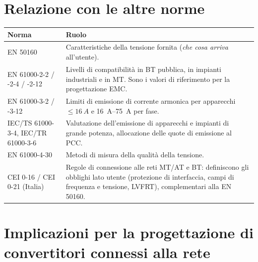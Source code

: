 \documentclass[11pt,a4paper]{article}
\begin{document}
\section{Relazione con le altre norme}

\begin{table}[h]
\centering
\small
\begin{tabular}{p{}p{}}
\toprule
\textbf{Norma} & \textbf{Ruolo} \\
\midrule
EN 50160 & Caratteristiche della tensione fornita (\emph{che cosa arriva} all'utente). \\
EN 61000-2-2 / -2-4 / -2-12 & Livelli di compatibilità in BT pubblica, in impianti
industriali e in MT. Sono i valori di riferimento per la progettazione EMC. \\
EN 61000-3-2 / -3-12 & Limiti di emissione di corrente armonica per apparecchi
$\le \SI{16}{A}$ e \SIrange{16}{75}{A} per fase. \\
IEC/TS 61000-3-4, IEC/TR 61000-3-6 & Valutazione dell'emissione di apparecchi e
impianti di grande potenza, allocazione delle quote di emissione al PCC. \\
EN 61000-4-30 & Metodi di misura della qualità della tensione. \\
CEI 0-16 / CEI 0-21 (Italia) & Regole di connessione alle reti MT/AT e BT: definiscono
gli obblighi lato utente (protezione di interfaccia, campi di frequenza e tensione,
LVFRT), complementari alla EN 50160. \\
\bottomrule
\end{tabular}
\end{table}

\section{Implicazioni per la progettazione di convertitori connessi alla rete}
\end{document}
